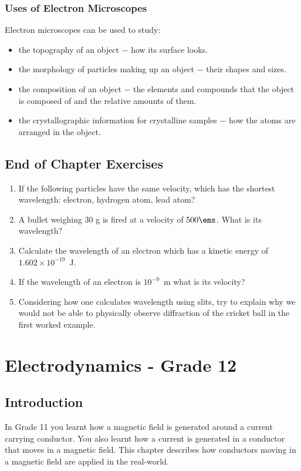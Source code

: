 \subsection{Uses of Electron Microscopes}
Electron microscopes can be used to study:
\begin{itemize}
\item the topography of an object $-$ how its surface looks.
\item the morphology of particles making up an object  $-$ their shapes and sizes.
\item the composition of an object $-$ the elements and compounds that the object is composed of and the relative amounts of them.
\item the crystallographic information for crystalline samples $-$ how the atoms are arranged in the object.
\end{itemize}


\section{End of Chapter Exercises}
\begin{enumerate}
  \item If the following particles have the same velocity, which has the shortest wavelength: electron, hydrogen atom, lead atom? 
\item A bullet weighing 30 g is fired at a velocity of $500\ems$. What is its wavelength?
\item Calculate the wavelength of an electron which has a kinetic energy of $1.602\times10^{-19}$~J.
\item If the wavelength of an electron is $10^{-9}$~m what is its velocity?
\item Considering how one calculates wavelength using slits, try to explain why we would not be able to physically observe diffraction of the cricket ball in the first worked example.
 \end{enumerate}






\chapter{Electrodynamics - Grade 12}
\label{p:em:ed12}



\section{Introduction}
In Grade 11 you learnt how a magnetic field is generated around a current carrying conductor. You also learnt how a current is generated in a conductor that moves in a magnetic field. This chapter describes how conductors moving in a magnetic field are applied in the real-world. 

